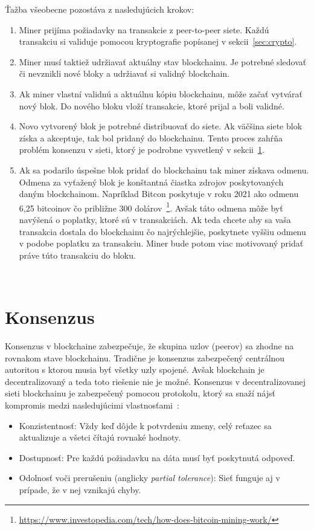 Ťažba všeobecne pozostáva z nasledujúcich krokov:
\begin{enumerate}
	\item Miner prijíma požiadavky na transakcie z peer-to-peer siete. Každú transakciu si validuje pomocou kryptografie popísanej v sekcii~\ref{sec:crypto}.
	\item Miner musí taktiež udržiavať aktuálny stav blockchainu. Je potrebné sledovať či nevznikli nové bloky a udržiavať si validný blockchain.
	\item Ak miner vlastní validnú a aktuálnu kópiu blockchainu, môže začať vytvárať nový blok. Do nového bloku vloží transakcie, ktoré prijal a boli validné.
	\item Novo vytvorený blok je potrebné distribuovať do siete. Ak väčšina siete blok získa a akceptuje, tak bol pridaný do blockchainu. Tento proces zahŕňa problém konsenzu v sieti, ktorý je podrobne vysvetlený v sekcii~\ref{sec:consenzus}.
	\item Ak sa podarilo úspešne blok pridať do blockchainu tak miner získava odmenu. Odmena za vyťažený blok je konštantná čiastka zdrojov poskytovaných daným blockchainom. Napríklad Bitcon poskytuje v roku 2021 ako odmenu 6,25 bitcoinov čo približne 300 dolárov~\footnote{\url{https://www.investopedia.com/tech/how-does-bitcoin-mining-work/}}. Avšak táto odmena môže byť navýšená o poplatky, ktoré sú v transakciách. Ak teda chcete aby sa vaša transakcia dostala do blockchainu čo najrýchlejšie, poskytnete vyššiu odmenu v podobe poplatku za transakciu. Miner bude potom viac motivovaný pridať práve túto transakciu do bloku.
\end{enumerate}

~\cite{narayanan2016bitcoin}

\section{Konsenzus}\label{sec:consenzus}
Konsenzus v blockchaine zabezpečuje, že skupina uzlov (peerov) sa  zhodne na rovnakom stave blockchainu. Tradične je konsenzus zabezpečený centrálnou autoritou s ktorou musia byť všetky uzly spojené. Avšak blockchain je decentralizovaný a teda toto riešenie nie je možné. Konsenzus v decentralizovanej sieti blockchainu je zabezpečený pomocou protokolu, ktorý sa snaží nájsť kompromis medzi nasledujúcimi vlastnosťami~\cite{gilbertCAP, zhangConsensus, leporeConsensus}:
\begin{itemize}
	\item Konzistentnosť: Vždy keď dôjde k potvrdeniu zmeny, celý reťazec sa aktualizuje a všetci čítajú rovnaké hodnoty.
	\item Dostupnosť: Pre každú požiadavku na dáta musí byť poskytnutá odpoveď.
	\item Odolnosť voči prerušeniu (anglicky \textit{partial tolerance}): Sieť funguje aj v prípade, že v nej vznikajú chyby.
\end{itemize}

